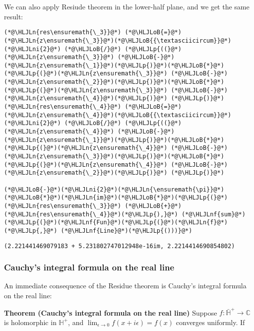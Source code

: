 \documentclass[12pt,a4paper]{article}
\newcommand{\HLJLn}[1]{#1}
\newcommand{\HLJLnf}[1]{\textcolor[RGB]{66,102,213}{#1}}
\newcommand{\HLJLni}[1]{\textcolor[RGB]{59,151,46}{#1}}
\newcommand{\HLJLoB}[1]{\textcolor[RGB]{102,102,102}{\textbf{#1}}}
\newcommand{\HLJLp}[1]{#1}
\begin{document}
We can also apply Resiude theorem in the lower-half plane, and we get the same result:


\begin{lstlisting}
(*@\HLJLn{res\ensuremath{\_3}}@*) (*@\HLJLoB{=}@*) (*@\HLJLn{z\ensuremath{\_3}}@*)(*@\HLJLoB{{\textasciicircum}}@*)(*@\HLJLni{2}@*) (*@\HLJLoB{/}@*) (*@\HLJLp{((}@*)(*@\HLJLn{z\ensuremath{\_3}}@*) (*@\HLJLoB{-}@*) (*@\HLJLn{z\ensuremath{\_1}}@*)(*@\HLJLp{)}@*)(*@\HLJLoB{*}@*)(*@\HLJLp{(}@*)(*@\HLJLn{z\ensuremath{\_3}}@*) (*@\HLJLoB{-}@*) (*@\HLJLn{z\ensuremath{\_2}}@*)(*@\HLJLp{)}@*)(*@\HLJLoB{*}@*)(*@\HLJLp{(}@*)(*@\HLJLn{z\ensuremath{\_3}}@*) (*@\HLJLoB{-}@*) (*@\HLJLn{z\ensuremath{\_4}}@*)(*@\HLJLp{)}@*) (*@\HLJLp{)}@*)
(*@\HLJLn{res\ensuremath{\_4}}@*) (*@\HLJLoB{=}@*) (*@\HLJLn{z\ensuremath{\_4}}@*)(*@\HLJLoB{{\textasciicircum}}@*)(*@\HLJLni{2}@*) (*@\HLJLoB{/}@*) (*@\HLJLp{((}@*)(*@\HLJLn{z\ensuremath{\_4}}@*) (*@\HLJLoB{-}@*) (*@\HLJLn{z\ensuremath{\_1}}@*)(*@\HLJLp{)}@*)(*@\HLJLoB{*}@*)(*@\HLJLp{(}@*)(*@\HLJLn{z\ensuremath{\_4}}@*) (*@\HLJLoB{-}@*) (*@\HLJLn{z\ensuremath{\_3}}@*)(*@\HLJLp{)}@*)(*@\HLJLoB{*}@*)(*@\HLJLp{(}@*)(*@\HLJLn{z\ensuremath{\_4}}@*) (*@\HLJLoB{-}@*) (*@\HLJLn{z\ensuremath{\_2}}@*)(*@\HLJLp{)}@*) (*@\HLJLp{)}@*)

(*@\HLJLoB{-}@*)(*@\HLJLni{2}@*)(*@\HLJLn{\ensuremath{\pi}}@*)(*@\HLJLoB{*}@*)(*@\HLJLn{im}@*)(*@\HLJLoB{*}@*)(*@\HLJLp{(}@*)(*@\HLJLn{res\ensuremath{\_3}}@*) (*@\HLJLoB{+}@*) (*@\HLJLn{res\ensuremath{\_4}}@*)(*@\HLJLp{),}@*) (*@\HLJLnf{sum}@*)(*@\HLJLp{(}@*)(*@\HLJLnf{Fun}@*)(*@\HLJLp{(}@*)(*@\HLJLn{f}@*)(*@\HLJLp{,}@*) (*@\HLJLnf{Line}@*)(*@\HLJLp{()))}@*)
\end{lstlisting}

\begin{lstlisting}
(2.221441469079183 + 5.231802747012948e-16im, 2.2214414690854802)
\end{lstlisting}


\subsubsection{Cauchy's integral formula on the real line}
An immediate consequence of the Residue theorem is Cauchy's integral formula on the real line:

\textbf{Theorem (Cauchy's integral formula on the real line)} Suppose $f : \bar {\mathbb H}^+  \rightarrow {\mathbb C}$ is holomorphic in ${\mathbb H}^+ $, and  $\lim_{\epsilon \rightarrow 0} f(x + i \epsilon) = f(x)$ converges uniformly.  If
\end{document}
